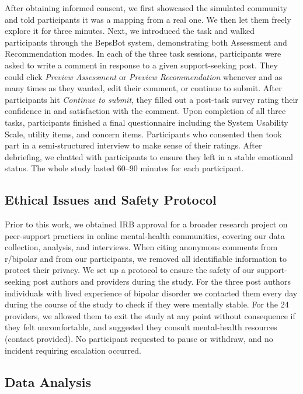\documentclass[]{llncs}
\begin{document}
After obtaining informed consent, we first showcased the simulated 
community and told participants it was a mapping from a real one. 
We then let them freely explore it for three minutes. Next, we 
introduced the task and walked participants through the BepsBot 
system, demonstrating both Assessment and Recommendation modes. 
In each of the three task sessions, participants were asked to 
write a comment in response to a given support-seeking post. They 
could click \textit{Preview Assessment} or \textit{Preview 
Recommendation} whenever and as many times as they wanted, edit 
their comment, or continue to submit. After participants hit 
\textit{Continue to submit}, they filled out a post-task survey 
rating their confidence in and satisfaction with the comment. 
Upon completion of all three tasks, participants finished a final 
questionnaire including the System Usability Scale, utility items, 
and concern items. Participants who consented then took 
part in a semi-structured interview to make sense of their ratings. 
After debriefing, we chatted with participants to ensure they left 
in a stable emotional status. The whole study lasted 60--90 minutes 
for each participant.

\subsection{Ethical Issues and Safety Protocol}

Prior to this work, we obtained IRB approval for a broader research 
project on peer-support practices in online mental-health communities, 
covering our data collection, analysis, and interviews. When citing 
anonymous comments from r/bipolar and from our participants, we removed 
all identifiable information to protect their privacy. We set up a 
protocol to ensure the safety of our support-seeking post authors 
and providers during the study. For the three post authors individuals 
with lived experience of bipolar disorder we contacted them every 
day during the course of the study to check if they were mentally 
stable. For the 24 providers, we allowed them to exit the study at 
any point without consequence if they felt uncomfortable, and 
suggested they consult mental-health resources (contact provided). 
No participant requested to pause or withdraw, and no incident 
requiring escalation occurred.

\subsection{Data Analysis}
\end{document}
